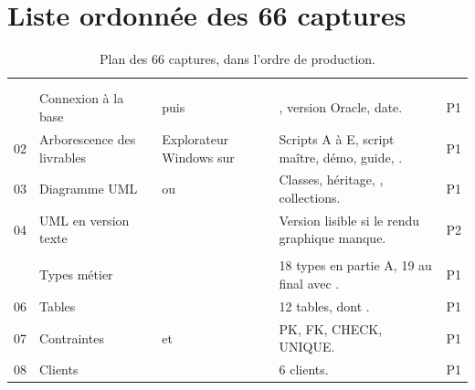 \section{Liste ordonnée des 66 captures}

{\footnotesize
\setlength{\tabcolsep}{3pt}
\begin{longtable}{@{}C{0.7cm}L{3.2cm}L{5.4cm}L{4.3cm}C{0.9cm}@{}}
\caption{Plan des 66 captures, dans l'ordre de production.}
\label{tab:captures}\\
\toprule
{} &  &  &
 &  \\
\midrule
\endfirsthead
\toprule
{} &  &  &
 &  \\
\midrule
\endhead
\bottomrule
\endfoot
{}\\
 & Connexion à la base &
puis
 &
, version Oracle, date. & P1 \\
02 & Arborescence des livrables &
Explorateur Windows sur  &
Scripts A à E, script maître, démo, guide, . & P1 \\
03 & Diagramme UML &
 ou  &
Classes, héritage, , collections. & P1 \\
04 & UML en version texte &
 &
Version lisible si le rendu graphique manque. & P2 \\
\addlinespace
{}\\
 & Types métier &
 &
18 types en partie A, 19 au final avec . & P1 \\
06 & Tables &
 &
12 tables, dont . & P1 \\
07 & Contraintes &
 et
 &
PK, FK, CHECK, UNIQUE. & P1 \\
08 & Clients &
 &
6 clients. & P1 \\

\end{longtable}}
